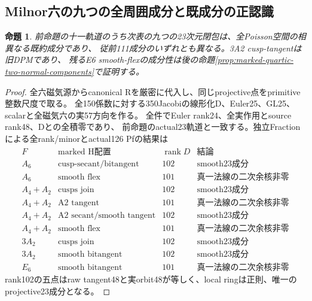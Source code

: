 \documentclass[a4paper,11pt]{ltjsarticle}
\newtheorem{proposition}{命題}[section]
\theoremstyle{definition}
\newcommand{\rank}{\operatorname{rank}}
\begin{document}
\subsection{Milnor六の九つの全周囲成分と既成分の正認識}
\begin{proposition}\label{prop:marked-quartic-mu6-nine-components}
前命題の十一軌道のうち次表の九つの23次元閉包は、全Poisson空間の相異なる既約成分であり、
従前111成分のいずれとも異なる。3A2 cusp-tangentは旧DPMであり、
残るE6 smooth-flexの成分性は後の命題\ref{prop:marked-quartic-two-normal-components}で証明する。
\end{proposition}
\begin{proof}
全六磁気源からcanonical Rを厳密に代入し、同じprojective点をprimitive整数尺度で取る。
全150係数に対する350Jacobiの線形化D、Euler25、GL25、scalarと全磁気六の実57方向を作る。
全件でEuler rank24、全実作用とsource rank48、Dとの全積零であり、
前命題のactual23軌道と一致する。独立Fractionによる全rank/minorとactual126 Pfの結果は
\[
\begin{array}{c|c|c|l}
 F&\text{marked H配置}&\rank D&\text{結論}\\\hline
 A_6&\text{cusp-secant/bitangent}&102&\text{smooth23成分}\\
 A_6&\text{smooth flex}&101&\text{真一法線の二次余核非零}\\
 A_4+A_2&\text{cusps join}&102&\text{smooth23成分}\\
 A_4+A_2&\text{A2 tangent}&101&\text{真一法線の二次余核非零}\\
 A_4+A_2&\text{A2 secant/smooth tangent}&102&\text{smooth23成分}\\
 A_4+A_2&\text{smooth flex}&101&\text{真一法線の二次余核非零}\\
 3A_2&\text{cusps join}&102&\text{smooth23成分}\\
 3A_2&\text{smooth bitangent}&102&\text{smooth23成分}\\
 E_6&\text{smooth bitangent}&101&\text{真一法線の二次余核非零}
\end{array}
\]
rank102の五点はraw tangent48と実orbit48が等しく、local ringは正則、唯一のprojective23成分となる。


\end{proof}
\end{document}
